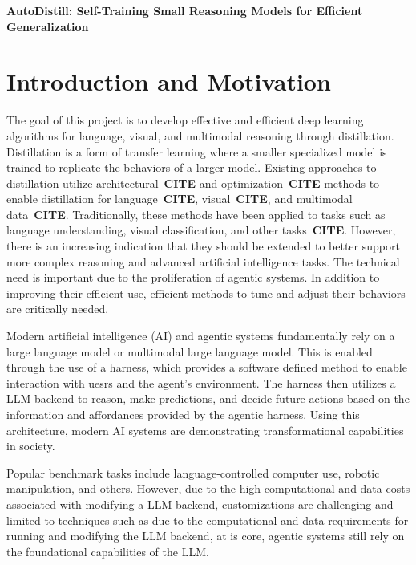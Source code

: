 {\centering
{\Large \textbf{AutoDistill: Self-Training Small Reasoning Models for Efficient Generalization}} \\}
\vspace{0.5em}

\section{Introduction and Motivation}

The goal of this project is to develop effective and efficient deep learning algorithms for language, visual, and multimodal reasoning through distillation. Distillation is a form of transfer learning where a smaller specialized model is trained to replicate the behaviors of a larger model. Existing approaches to distillation utilize architectural~\textbf{CITE} and optimization~\textbf{CITE} methods to enable distillation for language~\textbf{CITE}, visual~\textbf{CITE}, and multimodal data~\textbf{CITE}. Traditionally, these methods have been applied to tasks such as language understanding, visual classification, and other tasks~\textbf{CITE}. However, there is an increasing indication that they should be extended to better support more complex reasoning and advanced artificial intelligence tasks. The technical need is important due to the proliferation of agentic systems. In addition to improving their efficient use, efficient methods to tune and adjust their behaviors are critically needed. 

Modern artificial intelligence (AI) and agentic systems fundamentally rely on a large language model or multimodal large language model. This is enabled through the use of a harness, which provides a software defined method to enable interaction with uesrs and the agent's environment. The harness then utilizes a LLM backend to reason, make predictions, and decide future actions based on the information and affordances provided by the agentic harness. Using this architecture, modern AI systems are demonstrating transformational capabilities in society. 

Popular benchmark tasks include language-controlled computer use, robotic manipulation, and others. However, due to the high computational and data costs associated with modifying a LLM backend, customizations are challenging and limited to techniques such as due to the computational and data requirements for running and modifying the LLM backend, at is core, agentic systems still rely on the foundational capabilities of the LLM.

